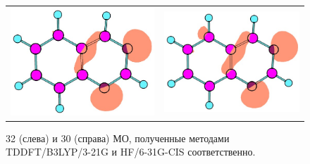 \begin{figure}[H]
\center
\begin{tabular}{cc}
\includegraphics[scale=0.35]{fig/TDDFT-32.jpg}
&
\includegraphics[scale=0.35]{fig/CIS-30.jpg}
\end{tabular}
\centering
\caption{32 (слева) и 30 (справа) МО, полученные методами TDDFT/B3LYP/3-21G и HF/6-31G-CIS соответственно.}
\end{figure}


